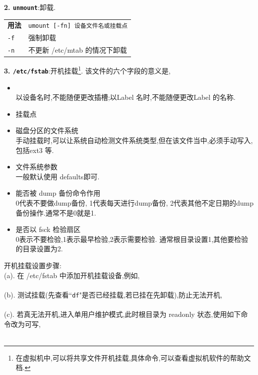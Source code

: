 \par
\textbf{2. \texttt{unmount}}:卸载.
\begin{longtable}{l@{: }p{}}\hline\hline
\textbf{用法} & \texttt{umount [-fn] 设备文件名或挂载点} \\

  \texttt{-f} & 强制卸载 \\

  \texttt{-n} & 不更新 /etc/mtab 的情况下卸载 \\

  \hline
\end{longtable}

\par
\textbf{3. \texttt{/etc/fstab}}:开机挂载\footnote[1]{在虚拟机中,可以将共享文件开机挂载,具体命令,可以查看虚拟机软件的帮助文档.}.
该文件的六个字段的意义是,
\begin{itemize}
 \item {}\\以设备名时,不能随便更改插槽;以Label 名时,不能随便更改Label 的名称.

 \item {\songti 挂载点}

 \item {\songti 磁盘分区的文件系统}\\
 手动挂载时,可以让系统自动检测文件系统类型,但在该文件当中,必须手动写入,包括ext3 等.

  \item {\songti 文件系统参数}\\
  一般默认使用 defaults即可.

  \item {\songti 能否被 dump 备份命令作用}\\
  0代表不要做dump备份, 1代表每天进行dump备份, 2代表其他不定日期的dump备份操作.通常不是0就是1.

  \item {\songti 是否以  fsck 检验扇区}\\
  0表示不要检验,1表示最早检验,2表示需要检验. 通常根目录设置1,其他要检验的目录设置为2.
\end{itemize}
开机挂载设置步骤:\\
(a). 在 /etc/fstab 中添加开机挂载设备,例如,\\
\\
(b). 测试挂载(先查看``\texttt{df}"是否已经挂载,若已挂在先卸载),防止无法开机, \\
\\
(c). 若真无法开机,进入单用户维护模式,此时根目录为 readonly 状态,使用如下命令改为可写,\\
\\


